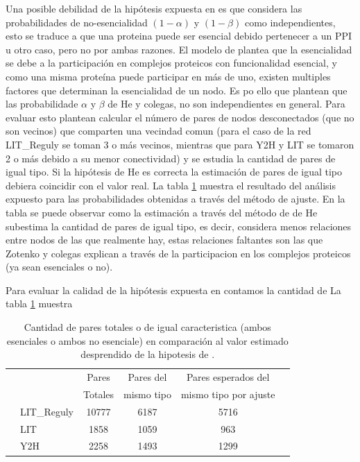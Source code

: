 Una posible debilidad de la hip\'otesis expuesta en \citet{he2006} es que considera las probabilidades de no-esencialidad $(1-\alpha)$ y $(1-\beta)$ como independientes, esto se traduce a que una proteina puede ser esencial debido pertenecer a un PPI u otro caso, pero no por ambas razones. El modelo de \citet{zotenko2008} plantea que la esencialidad se debe a la participaci\'on en complejos
proteicos con funcionalidad esencial, y como una misma prote\'ina puede participar en m\'as de uno, existen multiples factores que
determinan la esencialidad de un nodo. Es po ello que plantean que las probabilidade $\alpha$ y $\beta$ de He y colegas, no 
son independientes en general. Para evaluar esto plantean calcular el n\'umero de pares de nodos desconectados 
(que no son vecinos) que comparten una vecindad comun (para el caso de la red LIT\_Reguly se toman 3 o m\'as vecinos, 
mientras que para Y2H y LIT se tomaron 2 o m\'as debido a su menor conectividad) y se estudia la cantidad de pares de igual tipo. 
Si la hip\'otesis de He es correcta la estimaci\'on de pares de igual tipo debiera coincidir con el valor real. La tabla \ref{tab:pairs} muestra el resultado del an\'alisis expuesto para las probabilidades obtenidas a trav\'es del m\'etodo de ajuste. 
En la tabla se puede observar como la estimaci\'on a trav\'es del m\'etodo de de He subestima la cantidad de pares de igual tipo, 
es decir, considera menos relaciones entre nodos de las que realmente hay, estas relaciones faltantes son las que Zotenko y colegas
explican a trav\'es de la participacion en los complejos proteicos (ya sean esenciales o no).


Para evaluar la calidad de la hip\'otesis expuesta en \citet{he2006} contamos la cantidad de 
La tabla \ref{tab:pairs} muestra 


\begin{table}[!ht]
    \centering
    \caption{\label{tab:pairs} Cantidad de pares totales o de igual caracteristica (ambos esenciales o ambos no esenciale)
    en comparaci\'on al valor estimado desprendido de la hipotesis de \citet{he2006}.}
    {\scriptsize
    \begin{tabularx}{.9\columnwidth}{XlcccX}
        \hline\hline
        &               & Pares   & Pares del   & Pares esperados del       \\ 
        \cline{5-6}
        &               & Totales & mismo tipo  & mismo tipo por ajuste        &      \\
        \hline
        & LIT\_Reguly   & 10777   & 6187        &         5716          &               \\
        & LIT           & 1858    & 1059        &          963          &               \\
        & Y2H           & 2258    & 1493        &          1299         &               \\
        \hline\hline
    \end{tabularx}
    }
\end{table}
